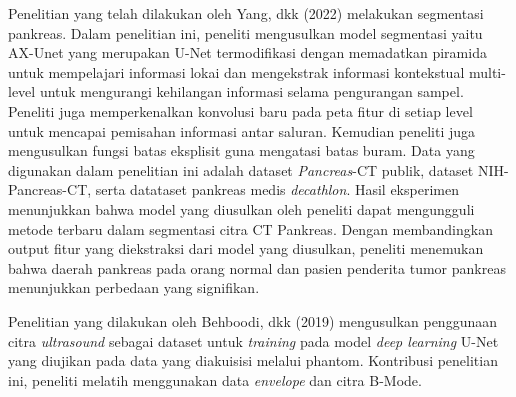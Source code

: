 Penelitian yang telah dilakukan oleh Yang, dkk (2022)\cite{yang2022ax}
melakukan segmentasi pankreas. Dalam penelitian ini, peneliti mengusulkan model segmentasi yaitu AX-Unet yang merupakan U-Net termodifikasi dengan memadatkan piramida untuk mempelajari informasi lokai dan mengekstrak informasi kontekstual multi-level untuk mengurangi kehilangan informasi selama pengurangan sampel. Peneliti juga memperkenalkan konvolusi baru pada peta fitur di setiap level untuk mencapai pemisahan informasi antar saluran. Kemudian peneliti juga mengusulkan fungsi batas eksplisit guna mengatasi batas buram. Data yang digunakan dalam penelitian ini adalah dataset \textit{Pancreas}-CT publik, dataset NIH-Pancreas-CT, serta datataset pankreas medis \textit{decathlon}. Hasil eksperimen menunjukkan bahwa model yang diusulkan oleh peneliti dapat mengungguli metode terbaru dalam segmentasi citra CT Pankreas. Dengan membandingkan output fitur yang diekstraksi dari model yang diusulkan, peneliti menemukan bahwa daerah pankreas pada orang normal dan pasien penderita tumor pankreas menunjukkan perbedaan yang signifikan.

Penelitian yang dilakukan oleh Behboodi, dkk (2019)\cite{behboodi2019ultrasound} mengusulkan penggunaan citra \textit{ultrasound} sebagai dataset untuk \textit{training} pada model \textit{deep learning} U-Net yang diujikan pada data yang diakuisisi melalui phantom. Kontribusi penelitian ini, peneliti melatih menggunakan data \textit{envelope} dan citra B-Mode.

